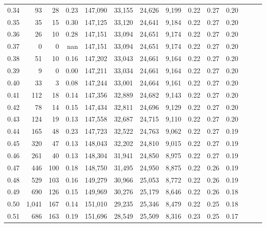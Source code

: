 \begin{tabular}{rrrrrrrrrrrrrr}
0.34 &      93 &     28 &  0.23 &  147,090 &   33,155 &  24,626 &   9,199 &  0.22 &  0.27 &      0.20 \\
0.35 &      35 &     15 &  0.30 &  147,125 &   33,120 &  24,641 &   9,184 &  0.22 &  0.27 &      0.20 \\
0.36 &      26 &     10 &  0.28 &  147,151 &   33,094 &  24,651 &   9,174 &  0.22 &  0.27 &      0.20 \\
0.37 &       0 &      0 &   nan &  147,151 &   33,094 &  24,651 &   9,174 &  0.22 &  0.27 &      0.20 \\
0.38 &      51 &     10 &  0.16 &  147,202 &   33,043 &  24,661 &   9,164 &  0.22 &  0.27 &      0.20 \\
0.39 &       9 &      0 &  0.00 &  147,211 &   33,034 &  24,661 &   9,164 &  0.22 &  0.27 &      0.20 \\
0.40 &      33 &      3 &  0.08 &  147,244 &   33,001 &  24,664 &   9,161 &  0.22 &  0.27 &      0.20 \\
0.41 &     112 &     18 &  0.14 &  147,356 &   32,889 &  24,682 &   9,143 &  0.22 &  0.27 &      0.20 \\
0.42 &      78 &     14 &  0.15 &  147,434 &   32,811 &  24,696 &   9,129 &  0.22 &  0.27 &      0.20 \\
0.43 &     124 &     19 &  0.13 &  147,558 &   32,687 &  24,715 &   9,110 &  0.22 &  0.27 &      0.20 \\
0.44 &     165 &     48 &  0.23 &  147,723 &   32,522 &  24,763 &   9,062 &  0.22 &  0.27 &      0.19 \\
0.45 &     320 &     47 &  0.13 &  148,043 &   32,202 &  24,810 &   9,015 &  0.22 &  0.27 &      0.19 \\
0.46 &     261 &     40 &  0.13 &  148,304 &   31,941 &  24,850 &   8,975 &  0.22 &  0.27 &      0.19 \\
0.47 &     446 &    100 &  0.18 &  148,750 &   31,495 &  24,950 &   8,875 &  0.22 &  0.26 &      0.19 \\
0.48 &     529 &    103 &  0.16 &  149,279 &   30,966 &  25,053 &   8,772 &  0.22 &  0.26 &      0.19 \\
0.49 &     690 &    126 &  0.15 &  149,969 &   30,276 &  25,179 &   8,646 &  0.22 &  0.26 &      0.18 \\
0.50 &   1,041 &    167 &  0.14 &  151,010 &   29,235 &  25,346 &   8,479 &  0.22 &  0.25 &      0.18 \\
0.51 &     686 &    163 &  0.19 &  151,696 &   28,549 &  25,509 &   8,316 &  0.23 &  0.25 &      0.17 \\

\end{tabular}
